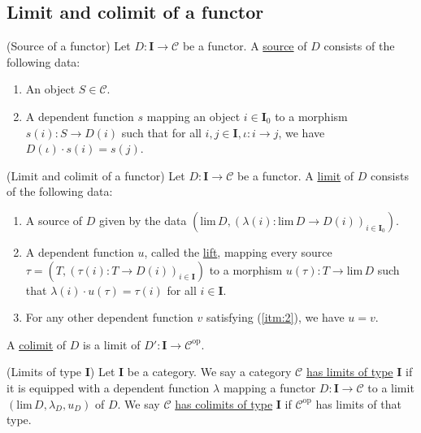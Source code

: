 
\subsection{Limit and colimit of a functor}

\begin{definition}{(Source of a functor)}
Let $D : \mathbf{I} \rightarrow \mathcal{C}$ be a functor. A \ul{source} of $D$ consists of the following data:
\begin{enumerate}
\renewcommand{\labelenumi}{(\theenumi)}
\item An object $S \in \mathcal{C}$.
\item A dependent function $s$ mapping an object $i \in \mathbf{I}_{0}$ to a morphism
$s(i) : S \rightarrow D(i)$ such that for all $i, j \in \mathbf{I}, \iota : i \rightarrow j$, we have $D(\iota) \cdot s(i) = s(j)$.
\end{enumerate}
\end{definition}

\begin{definition}{(Limit and colimit of a functor)}\label{def:limit}
Let $D : \mathbf{I} \rightarrow \mathcal{C}$ be a functor. A \ul{limit} of $D$ consists of the
following data:
\begin{enumerate}
\renewcommand{\labelenumi}{(\theenumi)}
\item A source of $D$ given by the data $(\mathrm{lim}\, D, (\lambda(i) : \mathrm{lim}\, D \rightarrow D(i))_{i\in\mathbf{I}_{0}})$.
\item A dependent function $u$, called the \ul{lift}, mapping every source $\tau = (T, (\tau(i) : T \rightarrow D(i))_{i \in \mathbf{I}})$ to a
morphism $u(\tau) : T \rightarrow \mathrm{lim}\, D$ such that $\lambda(i) \cdot u(\tau) = \tau(i)$ for all $i \in \mathbf{I}$.\label{itm:2}
\item For any other dependent function $v$ satisfying (\ref{itm:2}), we have $u = v$.
\end{enumerate}
A \ul{colimit} of $D$ is a limit of $D' : \mathbf{I} \rightarrow \mathcal{C}^{\mathrm{op}}$.
\end{definition}

\begin{definition}{(Limits of type \textbf{I})}
Let $\mathbf{I}$ be a category. We say a category $\mathcal{C}$ \ul{has limits of type} $\mathbf{I}$ if it is
equipped with a dependent function $\lambda$ mapping a functor $D : \mathbf{I} \rightarrow \mathcal{C}$ to a limit
$(\mathrm{lim}\, D, \lambda_{D}, u_{D})$ of $D$.
We say $\mathcal{C}$ \ul{has colimits of type} $\mathbf{I}$ if $\mathcal{C}^{\mathrm{op}}$ has limits of that type.
\end{definition}

